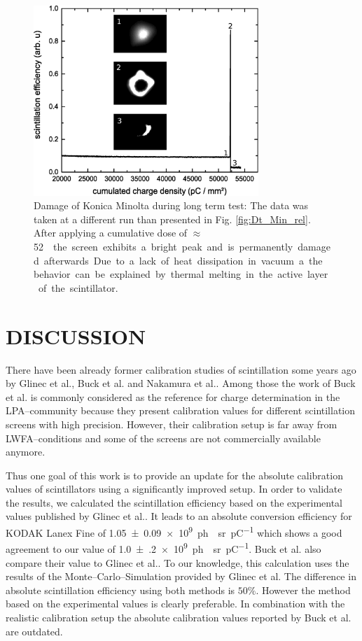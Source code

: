 \documentclass[%
reprint,
amsmath,
amssymb,
aip,
rsi, 
numerical,
floatfix,
]{revtex4-1}
\newcommand{\myCite}[1]{\textcolor{blue}{\cite{#1}}}
\begin{document}
\begin{figure}
\includegraphics[width=8.5cm]{./Figures/Damage}%
\caption{\label{fig:Damage} Damage of Konica Minolta during long term test: 
The data was taken at a different run than presented in Fig. \ref{fig:Dt_Min_rel}. 
After applying a cumulative dose of $\approx$ \SI[per-mode=symbol]{52}{\nano\coulomb \per \milli\meter\square} the screen exhibits a bright peak and is permanently damaged afterwards. 
Due to a lack of heat dissipation in vacuum a the behavior can be explained by thermal melting in the active layer of the scintillator.}
\end{figure}

\section{\label{Cn} DISCUSSION}
There have been already former calibration studies of scintillation some years ago by Glinec et al.\myCite{Glinec2006}, Buck et al.\myCite{Buck2010} and Nakamura et al.\myCite{Nakamura2011}.
Among those the work of Buck et al.\myCite{Buck2010} is commonly considered as the reference for charge determination in the LPA--community because they present calibration values for different scintillation screens with high precision.
However, their calibration setup is far away from LWFA--conditions and some of the screens are not commercially available anymore.

Thus one goal of this work is to provide an update for the absolute calibration values of scintillators using a significantly improved setup. 
In order to validate the results, we calculated the scintillation efficiency based on the experimental values published by Glinec et al.\myCite{Glinec2006}. 
It leads to an absolute conversion efficiency for KODAK Lanex Fine of \SI[separate-uncertainty = true]{1.05(9)e9}{ph \per \steradian \per \pico \coulomb} which shows a good agreement to our value of \SI[separate-uncertainty = true]{1.0(2)e9}{ph \per \steradian \per \pico \coulomb}.
Buck et al.\myCite{Buck2010} also compare their value to Glinec et al.\myCite{Glinec2006}.
To our knowledge, this calculation uses the results of the Monte--Carlo--Simulation provided by Glinec et al.
The difference in absolute scintillation efficiency using both methods is $50\%$. 
However the method based on the experimental values is clearly preferable.
In combination with the realistic calibration setup the absolute calibration values reported by Buck et al. are outdated. 
\end{document}
